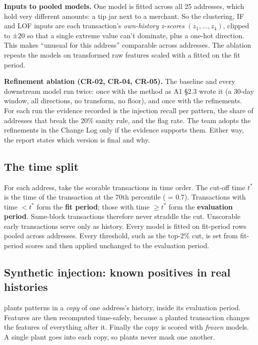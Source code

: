 \textbf{Inputs to pooled models.} One model is fitted across all 25 addresses, which hold very
different amounts: a tip jar next to a merchant. So the clustering, IF and LOF inputs are each
transaction's \emph{own-history z-scores} $(z_1,\dots,z_4)$, clipped to ±20 so that a single
extreme value can't dominate, plus a one-hot direction. This makes ``unusual for this address''
comparable across addresses. The ablation repeats the models on transformed raw features scaled
with a  fitted on the fit period.

\textbf{Refinement ablation (CR-02, CR-04, CR-05).} The baseline and every downstream model run
twice: once with the method as A1 §2.3 wrote it (a 30-day window, all directions, no transform,
no floor), and once with the refinements. For each run the evidence recorded is the injection
recall per pattern, the share of addresses that break the 20\% sanity rule, and the flag rate.
The team adopts the refinements in the Change Log only if the evidence supports them. Either way,
the report states which version is final and why.

\subsection{The time split}
\label{sec:split}

For each address, take the scorable transactions in time order. The cut-off time $t^\ast$ is the
time of the transaction at the 70th percentile ( = 0.7). Transactions with time
$< t^\ast$ form the \textbf{fit period}; those with time $\geq t^\ast$ form the \textbf{evaluation
period}. Same-block transactions therefore never straddle the cut. Unscorable early transactions
serve only as history. Every model is fitted on fit-period rows pooled across addresses. Every
threshold, such as the top-2\% cut, is set from fit-period scores and then applied unchanged to
the evaluation period.

\subsection{Synthetic injection: known positives in real histories}
\label{sec:injection}

 plants patterns in a \emph{copy} of one address's history, inside its
evaluation period. Features are then recomputed time-safely, because a planted transaction
changes the features of everything after it. Finally the copy is scored with \emph{frozen}
models. A single plant goes into each copy, so plants never mask one another.

